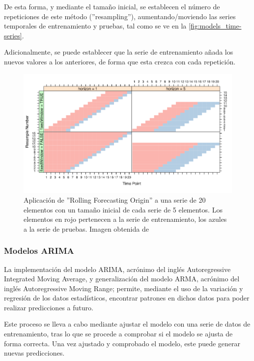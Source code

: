 De esta forma, y mediante el tamaño inicial, se establecen el número de repeticiones
de este método (''resampling''), aumentando/moviendo las series temporales de 
entrenamiento y pruebas, tal como se ve en la \autoref{fig:models_time-series}.

Adicionalmente, se puede establecer que la serie de entrenamiento añada los nuevos
valores a los anteriores, de forma que esta crezca con cada repetición.

\begin{figure}[htpb]
    \centering
    \includegraphics[width=\textwidth]{images/time-series.png}
    \caption{Aplicación de ''Rolling Forecasting Origin'' a una serie de 20 elementos con un tamaño inicial de cada serie de 5 elementos. Los elementos en rojo pertenecen a la serie de entrenamiento, los azules a la serie de pruebas. Imagen obtenida de \cite{web:caret}}
    \label{fig:models_time-series}
\end{figure}

\subsubsection*{Modelos ARIMA}

La implementación del modelo ARIMA, acrónimo del inglés Autoregressive Integrated 
Moving Average, y generalización del modelo ARMA, acrónimo del inglés
Autoregressive Moving Range; permite, mediante el uso de la variación y regresión
de los datos estadísticos, encontrar patrones en dichos datos para poder realizar
predicciones a futuro.

Este proceso se lleva a cabo mediante ajustar el modelo con una serie de datos
de entrenamiento, tras lo que se procede a comprobar si el modelo se ajusta de forma
correcta. Una vez ajustado y comprobado el modelo, este puede generar nuevas
predicciones.

